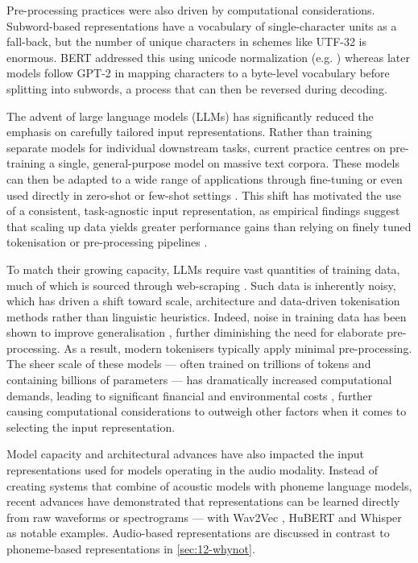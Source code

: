 Pre-processing practices were also driven by computational considerations. Subword-based representations have a vocabulary of single-character units as a fall-back, but the number of unique characters in schemes like UTF-32 is enormous. BERT addressed this using unicode normalization (e.g. \writemore) whereas later models follow GPT-2 \citep{radford-2019-gpt2} in mapping characters to a byte-level vocabulary before splitting into subwords, a process that can then be reversed during decoding.  

The advent of large language models (LLMs) has significantly reduced the emphasis on carefully tailored input representations. Rather than training separate models for individual downstream tasks, current practice centres on pre-training a single, general-purpose model on massive text corpora. These models can then be adapted to a wide range of applications through fine-tuning or even used directly in zero-shot or few-shot settings \citep{raffel2020exploring}. This shift has motivated the use of a consistent, task-agnostic input representation, as empirical findings suggest that scaling up data yields greater performance gains than relying on finely tuned tokenisation or pre-processing pipelines \citep{brown-2020-gpt3}. 

To match their growing capacity, LLMs require vast quantities of training data, much of which is sourced through web-scraping \citep{bansal-2022-datascaling}. Such data is inherently noisy, which has driven a shift toward scale, architecture and data-driven tokenisation methods rather than linguistic heuristics. Indeed, noise in training data has been shown to improve generalisation \citep{zheng-saparov-2023-noisy}, further diminishing the need for elaborate pre-processing. As a result, modern tokenisers typically apply minimal pre-processing. The sheer scale of these models --- often trained on trillions of tokens and containing billions of parameters --- has dramatically increased computational demands, leading to significant financial and environmental costs \citep{strubell-etal-2019-energy, patterson2021carbonemissionslargeneural, bender2021parrots, luccioni2022estimatingcarbonfootprintbloom}, further causing computational considerations to outweigh other factors when it comes to selecting the input representation. 


Model capacity and architectural advances have also impacted the input representations used for models operating in the audio modality. Instead of creating systems that combine of acoustic models with phoneme language models, recent advances have demonstrated that representations can be learned directly from raw waveforms or spectrograms --- with Wav2Vec \citep{baevski2020wav2vec}, HuBERT \citep{hsu2021hubert} and Whisper \citep{radford2023robust} as notable examples. Audio-based representations are discussed in contrast to phoneme-based representations in \cref{sec:12-whynot}.

